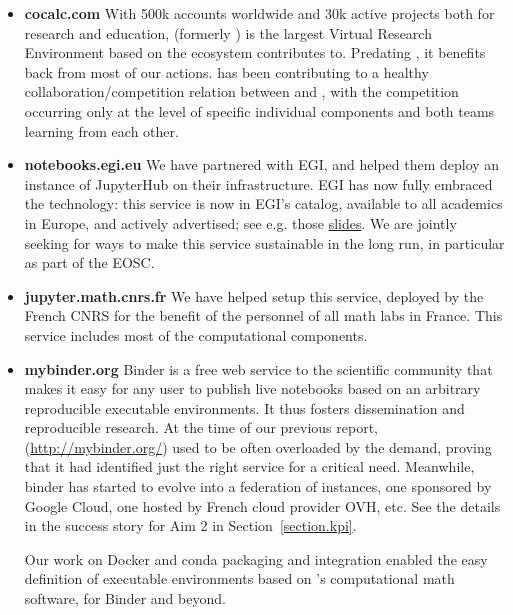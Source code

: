 \begin{itemize}
\item \textbf{cocalc.com} With 500k accounts worldwide and 30k active
  projects both for research and education, \cocalc (formerly \SMC) is the largest
  Virtual Research Environment based on the ecosystem \ODK contributes
  to. Predating \ODK, it benefits back from most of our actions. \ODK
  has been contributing to a healthy collaboration/competition
  relation between \JupyterHub and \cocalc, with the competition
  occurring only at the level of specific individual components and
  both teams learning from each other.

\item \textbf{notebooks.egi.eu} We have partnered with EGI, and helped them
  deploy an instance of JupyterHub on their infrastructure. EGI has
  now fully embraced the technology: this service is now in EGI's
  catalog, available to all academics in Europe, and actively
  advertised; see e.g. those
  \href{https://www.slideshare.net/EGI_Foundation/reproducible-open-science-with-egi-notebooks-binder-and-zenodo}{slides}.
  We are jointly seeking for ways to make this service sustainable in
  the long run, in particular as part of the EOSC.

\item \textbf{jupyter.math.cnrs.fr} We have helped setup this \JupyterHub
  service, deployed by the French CNRS for the benefit of the
  personnel of all math labs in France. This service includes most of the
  \ODK computational components.

\item \textbf{mybinder.org} Binder is a free web service to the scientific
  community that makes it easy for any user to publish live notebooks
  based on an arbitrary reproducible executable environments. It thus
  fosters dissemination and reproducible research. At the time of our
  previous report, (\url{http://mybinder.org/}) used to be often
  overloaded by the demand, proving that it had identified just the
  right service for a critical need. Meanwhile, binder has started to
  evolve into a federation of instances, one sponsored by Google
  Cloud, one hosted by French cloud provider OVH, etc. See the details
  in the success story for Aim 2 in Section~\ref{section.kpi}.

  Our work on Docker and conda packaging
   and \Jupyter
  integration  enabled the easy
  definition of executable environments based on \ODK's computational
  math software, for Binder and beyond.


\end{itemize}
